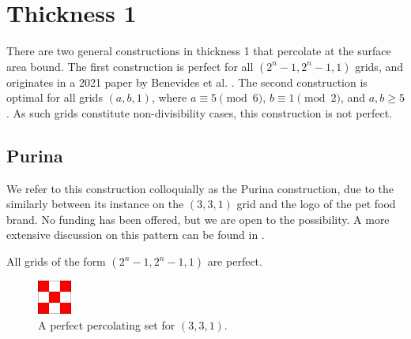 
\section{Thickness 1}

There are two general constructions in thickness 1 that percolate at the surface area bound. The first construction is perfect for all $(2^n-1, 2^n-1, 1)$ grids, and originates in a 2021 paper by Benevides et al. \cite{benevides:2021}. The second construction is optimal for all grids $(a,b,1)$, where $a \equiv 5 \pmod 6$, $b \equiv 1 \pmod 2$, and $a,b \geq 5$. As such grids constitute non-divisibility cases, this construction is not perfect.

\subsection{Purina}

We refer to this construction colloquially as the Purina construction, due to the similarly between its instance on the $(3,3,1)$ grid and the logo of the pet food brand. No funding has been offered, but we are open to the possibility. A more extensive discussion on this pattern can be found in \cite{benevides:2021}.

\begin{con}
\label{con:purina}
All grids of the form $(2^n-1, 2^n-1, 1)$ are perfect.
\end{con}

\begin{figure}[]
\centering
\includegraphics[width=0.1\textwidth]{figures/7/3x3x1.pdf}
\caption{A perfect percolating set for $(3,3,1)$.}
\label{fig:3x3x1}
\end{figure} 

